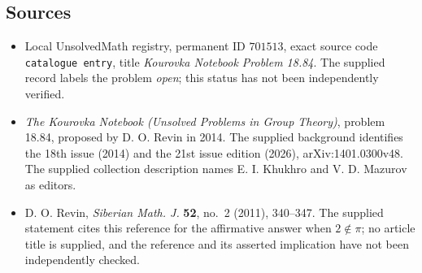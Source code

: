 \documentclass[11pt]{article}
\begin{document}
\subsection{Sources}
\begin{itemize}
\item Local UnsolvedMath registry, permanent ID \(701513\), exact source code \texttt{catalogue entry}, title \emph{Kourovka Notebook Problem 18.84}. The supplied record labels the problem \emph{open}; this status has not been independently verified.
\item \emph{The Kourovka Notebook (Unsolved Problems in Group Theory)}, problem 18.84, proposed by D. O. Revin in 2014. The supplied background identifies the 18th issue (2014) and the 21st issue edition (2026), arXiv:1401.0300v48. The supplied collection description names E. I. Khukhro and V. D. Mazurov as editors.
\item D. O. Revin, \emph{Siberian Math. J.} \textbf{52}, no.~2 (2011), 340--347. The supplied statement cites this reference for the affirmative answer when \(2\notin\pi\); no article title is supplied, and the reference and its asserted implication have not been independently checked.
\end{itemize}
\end{document}
